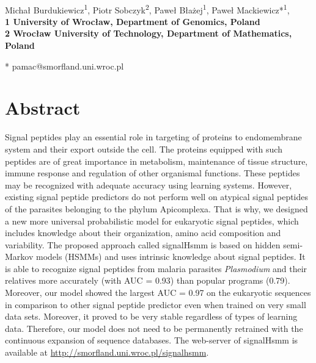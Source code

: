 \documentclass[10pt,letterpaper]{article}
\date{}
\begin{document}
\vspace*{0.35in}

\begin{flushleft}
{\Large
\textbf{}
}
\newline
\\
Micha\l{}  Burdukiewicz\textsuperscript{1},
Piotr Sobczyk\textsuperscript{2},
Pawe\l{} B\l{}a\.{z}ej\textsuperscript{1},
Pawe\l{} Mackiewicz*\textsuperscript{1},
\\
\bigskip
\bf{1} University of Wroc\l{}aw, Department of Genomics, Poland
\\
\bf{2} Wroc\l{}aw University of Technology, Department of Mathematics, Poland
\\
\bigskip

* pamac@smorfland.uni.wroc.pl

\end{flushleft}
\section*{Abstract}
Signal peptides play an essential role in targeting of proteins to endomembrane system and their export outside the cell. The proteins equipped with such peptides are of great importance in metabolism, maintenance of tissue structure, immune response and regulation of other organismal functions. These peptides may be recognized with adequate accuracy using learning systems. However, existing signal peptide predictors do not perform well on atypical signal peptides of the parasites belonging to the phylum Apicomplexa. That is why, we designed a new more universal probabilistic model for eukaryotic signal peptides, which includes knowledge about their organization, amino acid composition and variability. The proposed approach called signalHsmm is based on hidden semi-Markov models (HSMMs) and uses intrinsic knowledge about signal peptides. It is able to recognize signal peptides from malaria parasites \textit{Plasmodium} and their relatives more accurately (with AUC = 0.93) than popular programs (0.79). Moreover, our model showed the largest AUC = 0.97 on the eukaryotic sequences in comparison to other signal peptide predictor even when trained on very small data sets. Moreover, it proved to be very stable regardless of types of learning data. Therefore, our model does not need to be permanently retrained with the continuous expansion of sequence databases. The web-server of signalHsmm is available at \url{http://smorfland.uni.wroc.pl/signalhsmm}.
\end{document}
